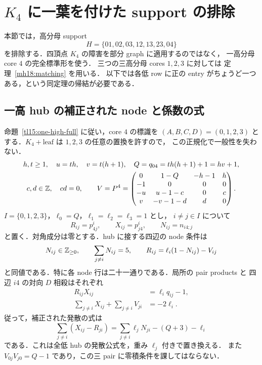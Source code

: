 \section{\texorpdfstring{$K_4$}{K4} に一葉を付けた support の排除}
\label{lh18:section}

本節では，高分母 support
\[
 H=\{01,02,03,12,13,23,04\}
\]
を排除する．四頂点 $K_4$ の障害を部分 graph に適用するのではなく，
一高分母 core $4$ の完全標準形を使う．
三つの三高分母 cores $1,2,3$ に対しては
定理~\ref{mh18:matching} を用いる．
以下では各低 row に正の entry がちょうど一つある，という同定理の帰結が必要である．

\subsection{一高 hub の補正された node と係数の式}

命題~\ref{tl15:one-high-full} に従い，core $4$ の標識を
$(A,B,C,D)=(0,1,2,3)$ とする．$K_4+\mathrm{leaf}$ は $1,2,3$ の任意の置換を許すので，
この正規化で一般性を失わない．
\begin{equation}\label{lh18:hub}
 \begin{gathered}
 h,t\ge1,\quad u=th,\quad v=t(h+1),\quad Q=q_{04}=th(h+1)+1=hv+1,\\
 c,d\in\mathbb Z,\quad cd=0,\qquad
 V=P^4=\begin{pmatrix}
 0&1-Q&-h-1&h\\
 -1&0&0&0\\
 -u&u-1-c&0&c\\
 v&-v-1-d&d&0
 \end{pmatrix}.
 \end{gathered}
\end{equation}
$I=\{0,1,2,3\}$，$\ell_0=Q$，$\ell_1=\ell_2=\ell_3=1$ とし，
$i\ne j\in I$ について
\[
 R_{ij}=p^i_{4j},\qquad X_{ij}=p^i_{j4},\qquad N_{ij}=n_{i4;j}
\]
と置く．対角成分は零とする．hub に接する四辺の node 条件は
\begin{equation}\label{lh18:node-reconstruction}
 N_{ij}\in\mathbb Z_{\ge0},\qquad \sum_{j\ne i}N_{ij}=5,\qquad
 R_{ij}=\ell_i(1-N_{ij})-V_{ij}
\end{equation}
と同値である．特に各 node 行は二十一通りである．局所の pair products と
四辺 $i4$ の対向 $D$ 相殺はそれぞれ
\begin{align}
 R_{ij}X_{ij}&=\ell_iq_{ij}-1,\label{lh18:pair}\\
 \sum_{j\ne i}X_{ij}+\sum_{j\ne i}V_{ji}&=-2\ell_i.\label{lh18:D}
\end{align}
従って，補正された発散の式は
\begin{equation}\label{lh18:weighted-flow}
 \sum_{j\ne i}(X_{ij}-R_{ji})
 =\sum_{j\ne i}\ell_jN_{ji}-(Q+3)-\ell_i
\end{equation}
である．これは全低 hub の発散公式を，重み $\ell_j$ 付きで置き換える．
また $V_{0j}V_{j0}=Q-1$ であり，この三 pair に零積条件を課してはならない．

